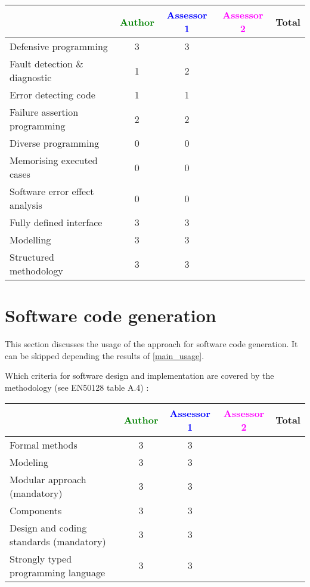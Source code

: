 \begin{tabular}{|l | c | c | c | c|}
\hline
& \textcolor{green}{Author} & \textcolor{blue}{Assessor 1} & \textcolor{magenta}{Assessor 2} & Total \\
\hline
Defensive programming  & 3 & 3 & &  \\
\hline 
Fault detection \& diagnostic  & 1 & 2 & &  \\
\hline
Error detecting code  & 1 & 1 & &  \\
\hline
Failure assertion programming & 2  & 2 & &  \\
\hline
Diverse programming & 0 & 0 & &  \\
\hline
Memorising executed cases & 0 & 0 & &  \\
\hline
Software error effect analysis & 0 & 0 & &  \\
\hline
Fully defined interface & 3 & 3 & &  \\
\hline
Modelling  & 3 & 3 & &  \\
\hline
Structured methodology & 3 & 3  &  \\
\hline
\end{tabular}

\section{Software code generation}
This section discusses the usage of the approach for software code generation.
It can be skipped depending the results of \ref{main_usage}.

Which criteria for software design and implementation are covered by the methodology
(see EN50128 table A.4) :

\begin{tabular}{|l | c | c | c | c|}
\hline
& \textcolor{green}{Author} & \textcolor{blue}{Assessor 1} & \textcolor{magenta}{Assessor 2} & Total \\
\hline
Formal methods  & 3 & 3 & &  \\
\hline 
Modeling  & 3 & 3 & &  \\
\hline
Modular approach (mandatory) & 3 & 3 & &  \\
\hline
Components & 3 & 3 & &  \\
\hline
Design and coding standards (mandatory) & 3 & 3 & &  \\
\hline
Strongly typed programming language & 3 & 3 & &  \\
\hline

\end{tabular}



